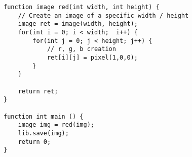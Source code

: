 \begin{lstlisting}[caption={red.lpx},label=list:red]
function image red(int width, int height) {
	// Create an image of a specific width / height
	image ret = image(width, height);
	for(int i = 0; i < width;  i++) {
		for(int j = 0; j < height; j++) {
			// r, g, b creation
			ret[i][j] = pixel(1,0,0);
		}
	}

	return ret;
}

function int main () {
	image img = red(img);
	lib.save(img);
	return 0;
}
\end{lstlisting}

